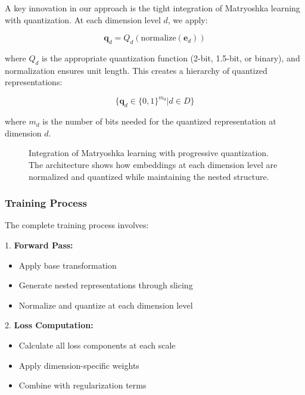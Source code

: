 A key innovation in our approach is the tight integration of Matryoshka learning with quantization. At each dimension level $d$, we apply:

\begin{equation}
    \mathbf{q}_d = Q_d(\text{normalize}(\mathbf{e}_d))
\end{equation}

where $Q_d$ is the appropriate quantization function (2-bit, 1.5-bit, or binary), and normalization ensures unit length. This creates a hierarchy of quantized representations:

\begin{equation}
    \{\mathbf{q}_d \in \{0,1\}^{m_d} | d \in D\}
\end{equation}

where $m_d$ is the number of bits needed for the quantized representation at dimension $d$.

\begin{figure}[h]
    \centering
    \caption{Integration of Matryoshka learning with progressive quantization. The architecture shows how embeddings at each dimension level are normalized and quantized while maintaining the nested structure.}
    \label{fig:matryoshka_quantization}
\end{figure}

\subsubsection{Training Process}

The complete training process involves:

1. \textbf{Forward Pass:}
   \begin{itemize}
       \item Apply base transformation
       \item Generate nested representations through slicing
       \item Normalize and quantize at each dimension level
   \end{itemize}

2. \textbf{Loss Computation:}
   \begin{itemize}
       \item Calculate all loss components at each scale
       \item Apply dimension-specific weights
       \item Combine with regularization terms
   \end{itemize}

